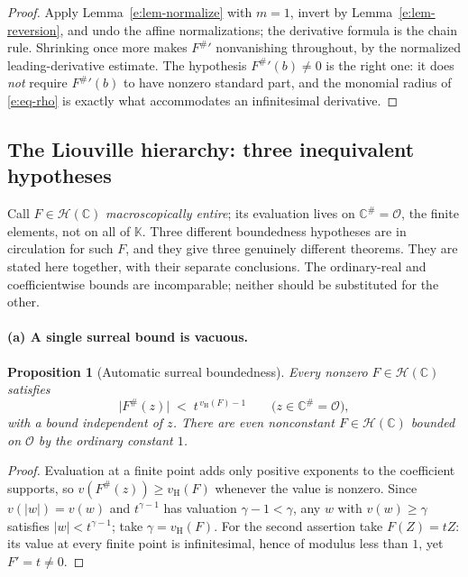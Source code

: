 \documentclass[11pt,a4paper]{article}
\numberwithin{equation}{section}
\newtheorem{proposition}[theorem]{Proposition}
\theoremstyle{definition}
\theoremstyle{remark}
\theoremstyle{plain}
\newcommand{\K}{\mathbb K}
\newcommand{\CC}{\mathbb C}
\newcommand{\Ov}{\mathcal O}
\newcommand{\tm}{t}
\newcommand{\halo}[1]{#1^{\#}}
\newcommand{\ev}[1]{#1^{\#}}
\newcommand{\Hc}{\mathcal H}
\newcommand{\vH}{v_{\mathrm H}}
\newcommand{\abs}[1]{\lvert #1\rvert}
\begin{document}
\begin{proof}
Apply Lemma~\ref{e:lem-normalize} with $m=1$, invert by
Lemma~\ref{e:lem-reversion}, and undo the affine normalizations; the
derivative formula is the chain rule.  Shrinking once more makes
$\ev F{}'$ nonvanishing throughout, by the normalized leading-derivative
estimate.  The hypothesis $\ev F{}'(b)\ne0$ is the right one: it does
\emph{not} require $\ev F{}'(b)$ to have nonzero standard part, and the
monomial radius of \eqref{e:eq-rho} is exactly what accommodates an
infinitesimal derivative.
\end{proof}

\subsection{The Liouville hierarchy: three inequivalent hypotheses}
\label{e:sec-liouville}

Call $F\in\Hc(\CC)$ \emph{macroscopically entire}; its evaluation lives on
$\halo{\CC}=\Ov$, the finite elements, not on all of $\K$.  Three
different boundedness hypotheses are in circulation for such $F$, and they
give three genuinely different theorems.  They are stated here together,
with their separate conclusions. The ordinary-real and coefficientwise
bounds are incomparable; neither should be substituted for the other.

\paragraph{(a) A single surreal bound is vacuous.}

\begin{proposition}[Automatic surreal boundedness]\label{e:prop-autobounded}
Every nonzero $F\in\Hc(\CC)$ satisfies
\begin{equation}\label{e:eq-automaticbound}
 \abs{\ev F(z)}\;<\;\tm^{\,\vH(F)-1}
 \qquad\bigl(z\in\halo{\CC}=\Ov\bigr),
\end{equation}
with a bound independent of $z$.  There are even nonconstant
$F\in\Hc(\CC)$ bounded on $\Ov$ by the ordinary constant $1$.
\end{proposition}

\begin{proof}
Evaluation at a finite point adds only positive exponents to the
coefficient supports, so $v(\ev F(z))\ge\vH(F)$ whenever the value is
nonzero.  Since $v(\abs w)=v(w)$ and $\tm^{\gamma-1}$ has valuation
$\gamma-1<\gamma$, any $w$ with $v(w)\ge\gamma$ satisfies
$\abs w<\tm^{\gamma-1}$; take $\gamma=\vH(F)$.  For the second assertion
take $F(Z)=\tm Z$: its value at every finite point is infinitesimal, hence
of modulus less than $1$, yet $F'=\tm\ne0$.
\end{proof}
\end{document}
